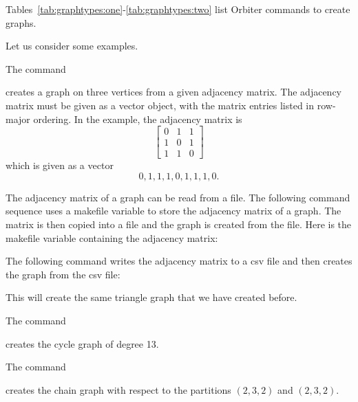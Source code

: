 Tables~\ref{tab:graphtypes:one}-\ref{tab:graphtypes:two} 
list Orbiter commands to create graphs.



\bigskip

Let us consider some examples.

\bigskip 

The command 


creates a graph on three vertices from a given adjacency matrix.
The adjacency matrix must be given as a vector object, with the matrix entries listed in row-major ordering.
In the example, the adjacency matrix is 
$$
\left[
\begin{array}{cccc}
0&1&1 \\
1&0&1 \\
1&1&0
\end{array}
\right]
$$
which is given as a vector 
$$
0,1,1, 1,0,1, 1,1,0.
$$

\bigskip 


The adjacency matrix of a graph can be read from a file. 
The following command sequence 
uses a makefile variable to store the adjacency matrix of a graph. 
The matrix is then copied into a file and the graph is created from the file. 
Here is the makefile variable containing the adjacency matrix:


The following command writes the adjacency matrix 
to a csv file and then creates 
the graph from the csv file:


This will create the same triangle graph that we have created before. 



\bigskip


The command 


creates the cycle graph of degree 13. 

\bigskip 



The command 


creates the chain graph with respect to the partitions $(2,3,2)$ and $(2,3,2)$. 



